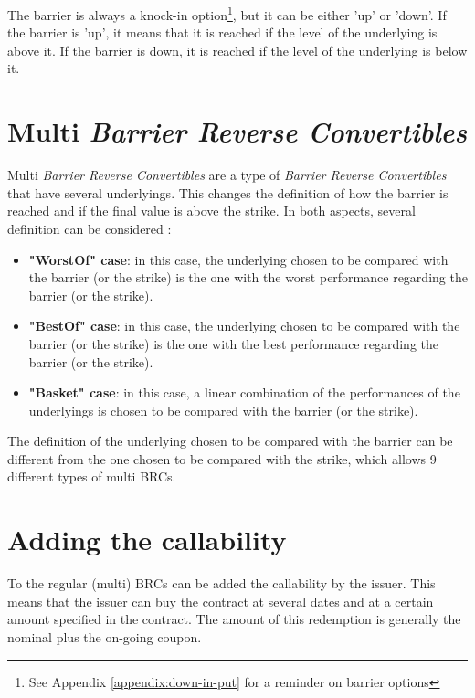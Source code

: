 \documentclass[a4paper,11pt,english]{book}
\begin{document}
The barrier is always a knock-in option\footnote{See Appendix \ref{appendix:down-in-put} for a reminder on barrier options}, but it can be either 'up' or 'down'. If the barrier is 'up', it means that it is reached if the level of the underlying is above it. If the barrier is down, it is reached if the level of the underlying is below it.

\section{Multi \textit{Barrier Reverse Convertibles}}
\label{sec:multi-BRC-definition}
Multi \textit{Barrier Reverse Convertibles} are a type of \textit{Barrier Reverse Convertibles} that have several underlyings. This changes the definition of how the barrier is reached and if the final value is above the strike. In both aspects, several definition can be considered :

\begin{itemize}
    \item \textbf{"WorstOf" case}: in this case, the underlying chosen to be compared with the barrier (or the strike) is the one with the worst performance regarding the barrier (or the strike).
    \item \textbf{"BestOf" case}: in this case, the underlying chosen to be compared with the barrier (or the strike) is the one with the best performance regarding the barrier (or the strike).
    \item \textbf{"Basket" case}: in this case, a linear combination of the performances of the underlyings is chosen to be compared with the barrier (or the strike).
\end{itemize}

The definition of the underlying chosen to be compared with the barrier can be different from the one chosen to be compared with the strike, which allows 9 different types of multi BRCs.

\section{Adding the callability}
To the regular (multi) BRCs can be added the callability by the issuer. This means that the issuer can buy the contract at several dates and at a certain amount specified in the contract. The amount of this redemption is generally the nominal plus the on-going coupon.

\end{document}

